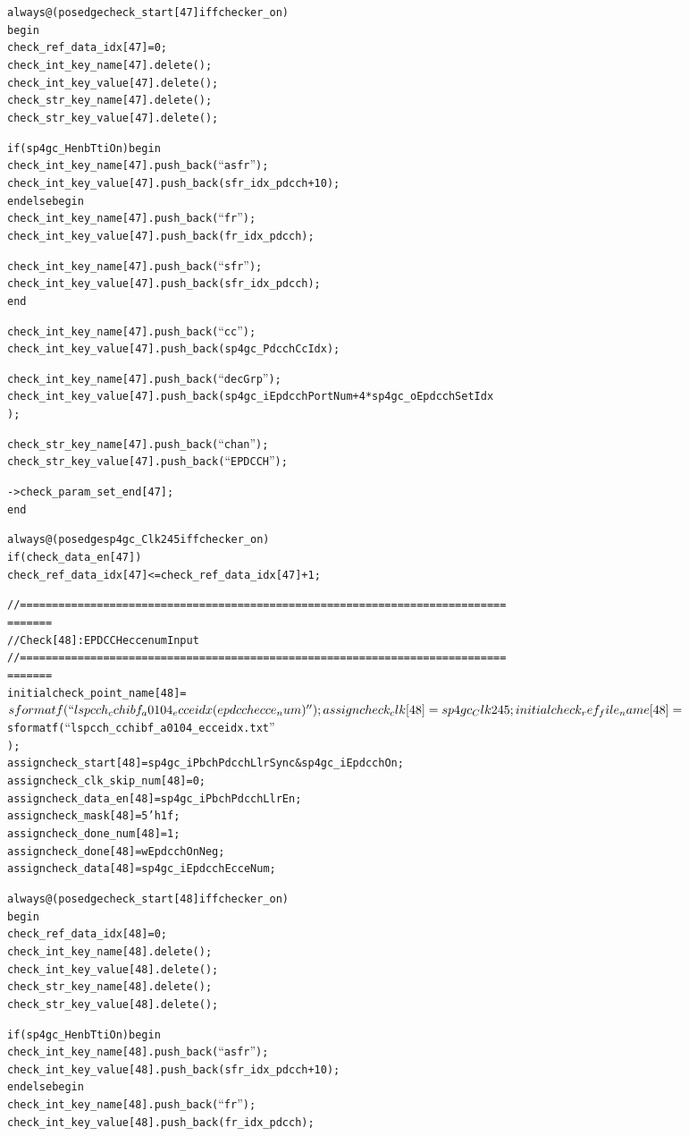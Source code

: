\documentclass{note}
\begin{document}
\begin{alltt}
  always@(posedge check_start[47] iff checker_on)
  begin
    check_ref_data_idx[47] = 0;
    check_int_key_name[47].delete();
    check_int_key_value[47].delete();
    check_str_key_name[47].delete();
    check_str_key_value[47].delete();

    if (sp4gc_HenbTtiOn) begin
      check_int_key_name[47].push_back(``asfr'');
      check_int_key_value[47].push_back(sfr_idx_pdcch+10);
    end else begin
      check_int_key_name[47].push_back(``fr'');
      check_int_key_value[47].push_back(fr_idx_pdcch);

      check_int_key_name[47].push_back(``sfr'');
      check_int_key_value[47].push_back(sfr_idx_pdcch);
    end

    check_int_key_name[47].push_back(``cc'');
    check_int_key_value[47].push_back(sp4gc_PdcchCcIdx);

    check_int_key_name[47].push_back(``decGrp'');
    check_int_key_value[47].push_back(sp4gc_iEpdcchPortNum+4*sp4gc_oEpdcchSetIdx
);

    check_str_key_name[47].push_back(``chan'');
    check_str_key_value[47].push_back(``EPDCCH'');

    ->check_param_set_end[47];
  end

  always@(posedge sp4gc_Clk245 iff checker_on)
    if(check_data_en[47])
      check_ref_data_idx[47] <= check_ref_data_idx[47]+1;

  //============================================================================
=======
  // Check [48] : EPDCCH ecce num Input
  //============================================================================
=======
  initial check_point_name[48]     = $sformatf(``lspcch_cchibf_a0104_ecceidx (epd
cch ecce_num)'');
  assign  check_clk[48]            = sp4gc_Clk245;
  initial check_ref_file_name[48]  = $sformatf(``lspcch_cchibf_a0104_ecceidx.txt''
);
  assign  check_start[48]          = sp4gc_iPbchPdcchLlrSync&sp4gc_iEpdcchOn;
  assign  check_clk_skip_num[48]   = 0;
  assign  check_data_en[48]        = sp4gc_iPbchPdcchLlrEn;
  assign  check_mask[48]           = 5'h1f;
  assign  check_done_num[48]       = 1;
  assign  check_done[48]           = wEpdcchOnNeg;
  assign  check_data[48]           = sp4gc_iEpdcchEcceNum;

  always@(posedge check_start[48] iff checker_on)
  begin
    check_ref_data_idx[48] = 0;
    check_int_key_name[48].delete();
    check_int_key_value[48].delete();
    check_str_key_name[48].delete();
    check_str_key_value[48].delete();

    if (sp4gc_HenbTtiOn) begin
      check_int_key_name[48].push_back(``asfr'');
      check_int_key_value[48].push_back(sfr_idx_pdcch+10);
    end else begin
      check_int_key_name[48].push_back(``fr'');
      check_int_key_value[48].push_back(fr_idx_pdcch);


\end{alltt}
\end{document}
